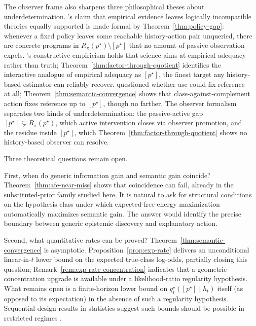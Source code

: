 \documentclass[11pt]{article}
\theoremstyle{definition}
\theoremstyle{remark}
\begin{document}
The observer frame also sharpens three philosophical theses about underdetermination. \citet{Quine1960}'s claim that empirical evidence leaves logically incompatible theories equally supported is made formal by Theorem~\ref{thm:policy-gap}: whenever a fixed policy leaves some reachable history-action pair unqueried, there are concrete programs in $R_\pi(p^\star)\setminus[p^\star]$ that no amount of passive observation expels. \citet{vanFraassen1980}'s constructive empiricism holds that science aims at empirical adequacy rather than truth; Theorem~\ref{thm:factor-through-quotient} identifies the interactive analogue of empirical adequacy as $[p^\star]$, the finest target any history-based estimator can reliably recover. \citet{Putnam1980} questioned whether use could fix reference at all; Theorem~\ref{thm:semantic-convergence} shows that class-against-complement action fixes reference up to $[p^\star]$, though no farther. The observer formalism separates two kinds of underdetermination: the passive-active gap $[p^\star]\subsetneq R_\pi(p^\star)$, which active intervention closes via observer promotion, and the residue inside $[p^\star]$, which Theorem~\ref{thm:factor-through-quotient} shows no history-based observer can resolve.

Three theoretical questions remain open.

First, when do generic information gain and semantic gain coincide? Theorem~\ref{thm:afe-near-miss} shows that coincidence can fail, already in the substituted-prior family studied here. It is natural to ask for structural conditions on the hypothesis class under which expected-free-energy maximization automatically maximizes semantic gain. The answer would identify the precise boundary between generic epistemic discovery and explanatory action.

Second, what quantitative rates can be proved? Theorem~\ref{thm:semantic-convergence} is asymptotic. Proposition~\ref{prop:exp-rate} delivers an unconditional linear-in-$t$ lower bound on the expected true-class log-odds, partially closing this question; Remark~\ref{rem:exp-rate-concentration} indicates that a geometric concentration upgrade is available under a likelihood-ratio regularity hypothesis. What remains open is a finite-horizon lower bound on $q_t^\star([p^\star]\mid h_t)$ itself (as opposed to its expectation) in the absence of such a regularity hypothesis. Sequential design results in statistics suggest such bounds should be possible in restricted regimes \citep{Chernoff1959,BoxHill1967}.
\end{document}
